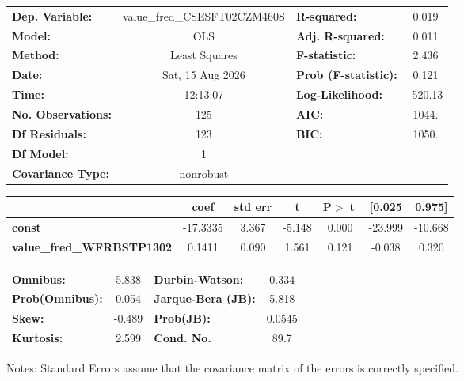 \begin{center}
\begin{tabular}{lclc}
\toprule
\textbf{Dep. Variable:}           & value\_fred\_CSESFT02CZM460S & \textbf{  R-squared:         } &     0.019   \\
\textbf{Model:}                   &             OLS              & \textbf{  Adj. R-squared:    } &     0.011   \\
\textbf{Method:}                  &        Least Squares         & \textbf{  F-statistic:       } &     2.436   \\
\textbf{Date:}                    &       Sat, 15 Aug 2026       & \textbf{  Prob (F-statistic):} &    0.121    \\
\textbf{Time:}                    &           12:13:07           & \textbf{  Log-Likelihood:    } &   -520.13   \\
\textbf{No. Observations:}        &               125            & \textbf{  AIC:               } &     1044.   \\
\textbf{Df Residuals:}            &               123            & \textbf{  BIC:               } &     1050.   \\
\textbf{Df Model:}                &                 1            & \textbf{                     } &             \\
\textbf{Covariance Type:}         &          nonrobust           & \textbf{                     } &             \\
\bottomrule
\end{tabular}
\begin{tabular}{lcccccc}
                                  & \textbf{coef} & \textbf{std err} & \textbf{t} & \textbf{P$> |$t$|$} & \textbf{[0.025} & \textbf{0.975]}  \\
\midrule
\textbf{const}                    &     -17.3335  &        3.367     &    -5.148  &         0.000        &      -23.999    &      -10.668     \\
\textbf{value\_fred\_WFRBSTP1302} &       0.1411  &        0.090     &     1.561  &         0.121        &       -0.038    &        0.320     \\
\bottomrule
\end{tabular}
\begin{tabular}{lclc}
\textbf{Omnibus:}       &  5.838 & \textbf{  Durbin-Watson:     } &    0.334  \\
\textbf{Prob(Omnibus):} &  0.054 & \textbf{  Jarque-Bera (JB):  } &    5.818  \\
\textbf{Skew:}          & -0.489 & \textbf{  Prob(JB):          } &   0.0545  \\
\textbf{Kurtosis:}      &  2.599 & \textbf{  Cond. No.          } &     89.7  \\
\bottomrule
\end{tabular}
\end{center}

Notes: \newline
 [1] Standard Errors assume that the covariance matrix of the errors is correctly specified.